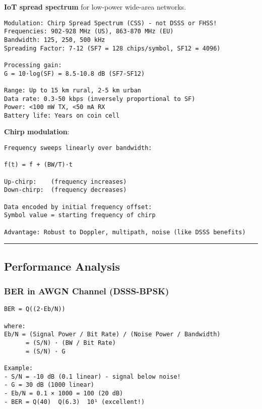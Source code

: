 \textbf{IoT spread spectrum} for low-power wide-area networks.

\begin{verbatim}
Modulation: Chirp Spread Spectrum (CSS) - not DSSS or FHSS!
Frequencies: 902-928 MHz (US), 863-870 MHz (EU)
Bandwidth: 125, 250, 500 kHz
Spreading Factor: 7-12 (SF7 = 128 chips/symbol, SF12 = 4096)

Processing gain:
G = 10·log(SF) = 8.5-10.8 dB (SF7-SF12)

Range: Up to 15 km rural, 2-5 km urban
Data rate: 0.3-50 kbps (inversely proportional to SF)
Power: <100 mW TX, <50 mA RX
Battery life: Years on coin cell
\end{verbatim}

\textbf{Chirp modulation}:

\begin{verbatim}
Frequency sweeps linearly over bandwidth:

f(t) = f + (BW/T)·t

Up-chirp:    (frequency increases)
Down-chirp:  (frequency decreases)

Data encoded by initial frequency offset:
Symbol value = starting frequency of chirp

Advantage: Robust to Doppler, multipath, noise (like DSSS benefits)
\end{verbatim}

\begin{center}\rule{0.5\linewidth}{0.5pt}\end{center}

\subsection{\texorpdfstring{ Performance
Analysis}{ Performance Analysis}}\label{performance-analysis}

\subsubsection{BER in AWGN Channel
(DSSS-BPSK)}\label{ber-in-awgn-channel-dsss-bpsk}

\begin{verbatim}
BER = Q((2·Eb/N))

where:
Eb/N = (Signal Power / Bit Rate) / (Noise Power / Bandwidth)
      = (S/N) · (BW / Bit Rate)
      = (S/N) · G

Example:
- S/N = -10 dB (0.1 linear) - signal below noise!
- G = 30 dB (1000 linear)
- Eb/N = 0.1 × 1000 = 100 (20 dB)
- BER = Q(40)  Q(6.3)  10¹ (excellent!)
\end{verbatim}

